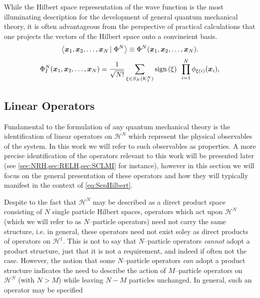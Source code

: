 While the Hilbert space representation of the wave function is the most illuminating description for the development of
general quantum mechanical theory, it is often advantageous from the perspective of practical calculations that one
projects the vectors of the Hilbert space onto a convineient basis. 
\begin{equation}
  \left\langle \boldsymbol{x}_1,\boldsymbol{x}_2,\ldots,\boldsymbol{x}_N \left\vert\right. \Phi^N \right\rangle \equiv \Phi^N(\boldsymbol{x}_1,\boldsymbol{x}_2,\ldots,\boldsymbol{x}_N).
\end{equation}
\begin{equation}
  \label{eq:SlaterDetSpace}
  \Phi_I^N(\boldsymbol{x}_1,\boldsymbol{x}_2,\ldots,\boldsymbol{x}_N) = \frac{1}{\sqrt{N!}} \sum_{\xi \in S_N(\mathcal{K}^N_I)} \mathrm{sign}\left( \xi \right) \text{ } 
    \prod_{i = 1 }^N \phi_{\xi(i)}(\boldsymbol{x}_i),
\end{equation}

\subsection{Linear Operators}
\label{sec:LO}

Fundamental to the formulation of any quantum mechanical theory is the identification of linear operators on $\mathcal{H}^N$
which represent the physical observables of the system. In this work we will refer to such observables as properties. A
more precise identification of the operators relevant to this work will be presented later 
(see \cref{sec:NRH,sec:RELH,sec:SCLMI} for instance), however in this section we will focus on the general presentation
of these operators and how they will typically manifest in the context of \cref{eq:SepHilbert}. 

Despite to the fact that $\mathcal{H}^N$ may be described as a direct product space consisting of $N$ single particle
Hilbert spaces, operators which act upon $\mathcal{H}^N$ (which we will refer to as $N$--particle operators) need not carry the same structure, 
i.e. in general, these operators need not exist soley as direct products of operators on $\mathcal{H}^1$. This is not to say
that $N$--particle operators \emph{cannot} adopt a product structure, just that it is not a requirement, and indeed
if often not the case. However, the notion that some $N$--particle operators \emph{can} adopt a product structure indicates the need
to describe the action of $M$--particle operators on $\mathcal{H}^N$ (with $N>M$) while leaving $N-M$ particles unchanged.
In general, such an operator may be specified 



